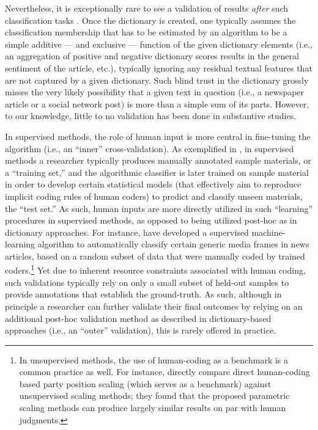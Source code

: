\documentclass[man, 12pt, a4paper, nolmodern, noextraspace]{apa6}
\begin{document}
    Nevertheless, it is exceptionally rare to see a validation of results \textit{after} such classification tasks \parencites[yet for notable exceptions, see][]{muddiman2018re, YoungSoroka2012, gonzalez2015signals}. Once the dictionary is created, one typically assumes the classification membership that has to be estimated by an algorithm to be a simple additive --- and exclusive --- function of the given dictionary elements (i.e., an aggregation of positive and negative dictionary scores results in the general sentiment of the article, etc.), typically ignoring any residual textual features that are not captured by a given dictionary. Such blind trust in the dictionary grossly misses the very likely possibility that a given text in question (i.e., a newspaper article or a social network post) is more than a simple sum of its parts. However, to our knowledge, little to no validation has been done in substantive studies.
    
    In supervised methods, the role of human input is more central in fine-tuning the algorithm (i.e., an \enquote{inner} cross-validation). As exemplified in \textcite{scharkow2013thematic}, in supervised methods a researcher typically produces manually annotated sample materials, or a \enquote{training set,} and the algorithmic classifier is later trained on sample material in order to develop certain statistical models (that effectively aim to reproduce implicit coding rules of human coders) to predict and classify unseen materials, the \enquote{test set.} As such, human inputs are more directly utilized in such \enquote{learning} procedures in supervised methods, as opposed to being utilized post-hoc as in dictionary approaches. For instance, \textcite{burscher2014teaching} have developed a supervised machine-learning algorithm to automatically classify certain generic media frames in news articles, based on a random subset of data that were manually coded by trained coders.\footnote{In unsupervised methods, the use of human-coding as a benchmark is a common practice as well. For instance, \textcite{lowe2013validating} directly compare direct human-coding based party position scaling (which serves as a benchmark) against unsupervised scaling methods; they found that the proposed parametric scaling methods can produce largely similar results on par with human judgments.} Yet due to inherent resource constraints associated with human coding, such validations typically rely on only a small subset of held-out samples to provide annotations that establish the ground-truth. As such, although in principle a researcher can further validate their final outcomes by relying on an additional post-hoc validation method as described in dictionary-based approaches (i.e., an \enquote{outer} validation), this is rarely offered in practice.   
    
\end{document}
